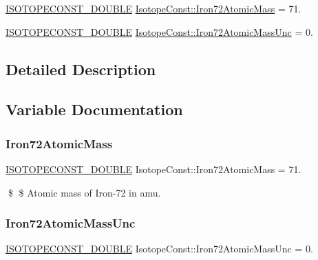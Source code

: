 \begin{DoxyCompactItemize}
\item 
\mbox{\hyperlink{group___isotope_const-_macros_ga8f45a7272ce02c0b4c65c44636ed719a}{I\+S\+O\+T\+O\+P\+E\+C\+O\+N\+S\+T\+\_\+\+D\+O\+U\+B\+LE}} \mbox{\hyperlink{group___isotope_const-_iron-_fe72_gac15913d24357e884988ef016d635664e}{Isotope\+Const\+::\+Iron72\+Atomic\+Mass}} = 71.
\item 
\mbox{\hyperlink{group___isotope_const-_macros_ga8f45a7272ce02c0b4c65c44636ed719a}{I\+S\+O\+T\+O\+P\+E\+C\+O\+N\+S\+T\+\_\+\+D\+O\+U\+B\+LE}} \mbox{\hyperlink{group___isotope_const-_iron-_fe72_ga98bf40f0ffc1068ce3faff3c134e188d}{Isotope\+Const\+::\+Iron72\+Atomic\+Mass\+Unc}} = 0.
\end{DoxyCompactItemize}


\subsection{Detailed Description}


\subsection{Variable Documentation}
\mbox{\label{group___isotope_const-_iron-_fe72_gac15913d24357e884988ef016d635664e}} 
\subsubsection{\texorpdfstring{Iron72\+Atomic\+Mass}{Iron72AtomicMass}}
{\footnotesize\ttfamily \mbox{\hyperlink{group___isotope_const-_macros_ga8f45a7272ce02c0b4c65c44636ed719a}{I\+S\+O\+T\+O\+P\+E\+C\+O\+N\+S\+T\+\_\+\+D\+O\+U\+B\+LE}} Isotope\+Const\+::\+Iron72\+Atomic\+Mass = 71.}

\$ \$ Atomic mass of Iron-\/72 in amu. \mbox{\label{group___isotope_const-_iron-_fe72_ga98bf40f0ffc1068ce3faff3c134e188d}} 
\subsubsection{\texorpdfstring{Iron72\+Atomic\+Mass\+Unc}{Iron72AtomicMassUnc}}
{\footnotesize\ttfamily \mbox{\hyperlink{group___isotope_const-_macros_ga8f45a7272ce02c0b4c65c44636ed719a}{I\+S\+O\+T\+O\+P\+E\+C\+O\+N\+S\+T\+\_\+\+D\+O\+U\+B\+LE}} Isotope\+Const\+::\+Iron72\+Atomic\+Mass\+Unc = 0.}

